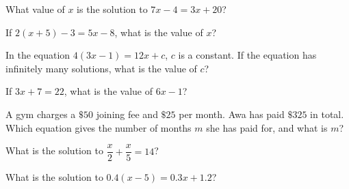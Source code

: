 \renewcommand{\nocalc}{}
\newcommand{\gr}[2]{\begin{center}\begin{tikzpicture}\begin{axis}[gridaxis,#1]#2\end{axis}\end{tikzpicture}\end{center}}
\newcommand{\pt}[1]{\node[circle,fill=apblue,inner sep=1.5pt] at (axis cs:#1){};}
\newcommand{\op}[1]{\node[circle,draw=apblue,fill=white,thick,inner sep=1.5pt] at (axis cs:#1){};}

\begin{exo}{}
What value of $x$ is the solution to $7x-4=3x+20$?
\end{exo}
\begin{exo}{}
If $2(x+5)-3=5x-8$, what is the value of $x$?
\end{exo}
\begin{exo}{}
In the equation $4(3x-1)=12x+c$, $c$ is a constant. If the equation has infinitely many solutions, what is the value of $c$?
\end{exo}
\begin{exo}{}
If $3x+7=22$, what is the value of $6x-1$?
\end{exo}
\begin{exo}{}
A gym charges a $\$50$ joining fee and $\$25$ per month. Awa has paid $\$325$ in total. Which equation gives the number of months $m$ she has paid for, and what is $m$?
\end{exo}
\begin{exo}{}
What is the solution to $\dfrac{x}{2}+\dfrac{x}{5}=14$?
\end{exo}
\begin{exo}{\sprtag}
What is the solution to $0.4(x-5)=0.3x+1.2$?
\end{exo}
